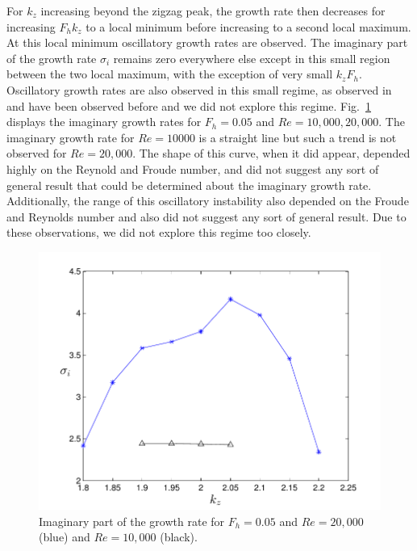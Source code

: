 For $k_{z}$ increasing beyond the zigzag peak, the growth rate then decreases for increasing $F_{h}k_{z}$ to a local minimum before increasing to a second local maximum. At this local minimum oscillatory growth rates are observed. The imaginary part of the growth rate $\sigma_{i}$ remains zero everywhere else except in this small region between the two local maximum, with the exception of very small $k_{z}F_{h}$. Oscillatory growth rates are also observed in this small regime, as observed in \cite{bc1999} and have been observed before \cite{bc1999} and we did not explore this regime. Fig.~\ref{oscillatory_growth} displays the imaginary growth rates for $F_{h}=0.05$ and $Re=10{,}000, 20{,}000$. The imaginary growth rate for $Re=10000$ is a straight line but such a trend is not observed for $Re=20{,}000$. The shape of this curve, when it did appear, depended highly on the Reynold and Froude number, and did not suggest any sort of general result that could be determined about the imaginary growth rate. Additionally, the range of this oscillatory instability also depended on the Froude and Reynolds number and also did not suggest any sort of general result. Due to these observations, we did not explore this regime too closely. 
\begin{figure}
\begin{center}
\includegraphics[scale=0.65]{oscillatory_growth}
\caption{Imaginary part of the growth rate for $F_{h}=0.05$ and $Re=20{,}000$ (blue) and $Re=10{,}000$ (black).}
\label{oscillatory_growth}
\end{center}
\end{figure} 

